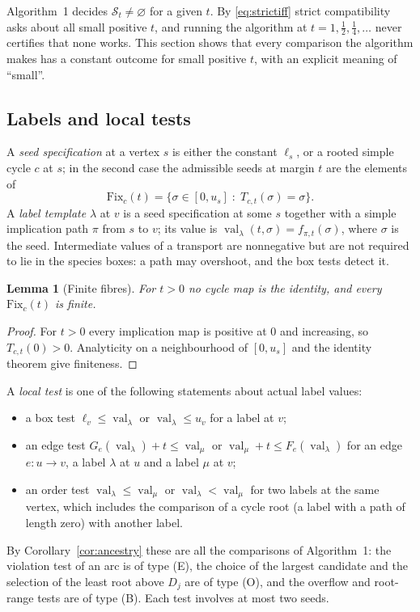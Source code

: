 \documentclass[11pt,a4paper]{article}
\theoremstyle{plain}
\newtheorem{lemma}[theorem]{Lemma}
\theoremstyle{definition}
\theoremstyle{remark}
\newcommand{\St}{\mathcal{S}_t}
\newcommand{\val}{\operatorname{val}}
\begin{document}
Algorithm~1 decides $\St\neq\varnothing$ for a given $t$. By \eqref{eq:strictiff} strict compatibility asks about all small positive $t$, and running the algorithm at $t=1,\tfrac12,\tfrac14,\dots$ never certifies that none works. This section shows that every comparison the algorithm makes has a constant outcome for small positive $t$, with an explicit meaning of ``small''.

\subsection{Labels and local tests}
A \emph{seed specification} at a vertex $s$ is either the constant $\ell_s$, or a rooted simple cycle $c$ at $s$; in the second case the admissible seeds at margin $t$ are the elements of
\[
  \mathrm{Fix}_c(t)=\{\sigma\in[0,u_s]\;:\;T_{c,t}(\sigma)=\sigma\}.
\]
A \emph{label template} $\lambda$ at $v$ is a seed specification at some $s$ together with a simple implication path $\pi$ from $s$ to $v$; its value is $\val_\lambda(t,\sigma)=f_{\pi,t}(\sigma)$, where $\sigma$ is the seed. Intermediate values of a transport are nonnegative but are not required to lie in the species boxes: a path may overshoot, and the box tests detect it.

\begin{lemma}[Finite fibres]\label{lem:fibres}
For $t>0$ no cycle map is the identity, and every $\mathrm{Fix}_c(t)$ is finite.
\end{lemma}
\begin{proof}
For $t>0$ every implication map is positive at $0$ and increasing, so $T_{c,t}(0)>0$. Analyticity on a neighbourhood of $[0,u_s]$ and the identity theorem give finiteness.
\end{proof}

A \emph{local test} is one of the following statements about actual label values:
\begin{itemize}
\item[(B)] a box test $\ell_v\le\val_\lambda$ or $\val_\lambda\le u_v$ for a label at $v$;
\item[(E)] an edge test $G_e(\val_\lambda)+t\le\val_\mu$ or $\val_\mu+t\le F_e(\val_\lambda)$ for an edge $e\colon u\to v$, a label $\lambda$ at $u$ and a label $\mu$ at $v$;
\item[(O)] an order test $\val_\lambda\le\val_\mu$ or $\val_\lambda<\val_\mu$ for two labels at the same vertex, which includes the comparison of a cycle root (a label with a path of length zero) with another label.
\end{itemize}
By Corollary~\ref{cor:ancestry} these are all the comparisons of Algorithm~1: the violation test of an arc is of type (E), the choice of the largest candidate and the selection of the least root above $D_j$ are of type (O), and the overflow and root-range tests are of type (B). Each test involves at most two seeds.
\end{document}
